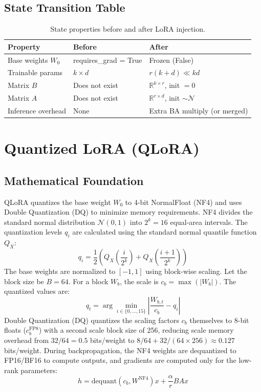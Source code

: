 \subsection{State Transition Table}
\begin{table}[h]\centering
\begin{tabular}{lll}\toprule
\textbf{Property} & \textbf{Before} & \textbf{After}\\\midrule
Base weights $W_0$ & requires\_grad = True & Frozen (False)\\
Trainable params & $k \times d$ & $r(k+d) \ll kd$\\
Matrix $B$ & Does not exist & $\mathbb{R}^{k\times r}$, init $= 0$\\
Matrix $A$ & Does not exist & $\mathbb{R}^{r\times d}$, init $\sim \mathcal{N}$\\
Inference overhead & None & Extra BA multiply (or merged)\\\bottomrule
\end{tabular}
\caption{State properties before and after LoRA injection.}
\end{table}

\newpage
\section{Quantized LoRA (QLoRA)}

\subsection{Mathematical Foundation}
QLoRA quantizes the base weight $W_0$ to 4-bit NormalFloat (NF4) and uses Double Quantization (DQ) to minimize memory requirements.
NF4 divides the standard normal distribution $\mathcal{N}(0, 1)$ into $2^k=16$ equal-area intervals. The quantization levels $q_i$ are calculated using the standard normal quantile function $Q_X$:
\begin{equation}
  q_i = \frac{1}{2} \left( Q_X\left(\frac{i}{2^k}\right) + Q_X\left(\frac{i+1}{2^k}\right) \right)
\end{equation}
The base weights are normalized to $[-1, 1]$ using block-wise scaling. Let the block size be $B=64$. For a block $W_b$, the scale is $c_b = \max(|W_b|)$. The quantized values are:
\begin{equation}
  q_t = \arg\min_{i \in \{0, \dots, 15\}} \left| \frac{W_{b,t}}{c_b} - q_i \right|
\end{equation}
Double Quantization (DQ) quantizes the scaling factors $c_b$ themselves to 8-bit floats ($c_b^{\text{FP8}}$) with a second scale block size of 256, reducing scale memory overhead from $32/64 = 0.5$ bits/weight to $8/64 + 32/(64 \times 256) \approx 0.127$ bits/weight.
During backpropagation, the NF4 weights are dequantized to FP16/BF16 to compute outputs, and gradients are computed only for the low-rank parameters:
\begin{equation}
  h = \text{dequant}(c_b, W^{\text{NF4}}) x + \frac{\alpha}{r} B A x
\end{equation}

